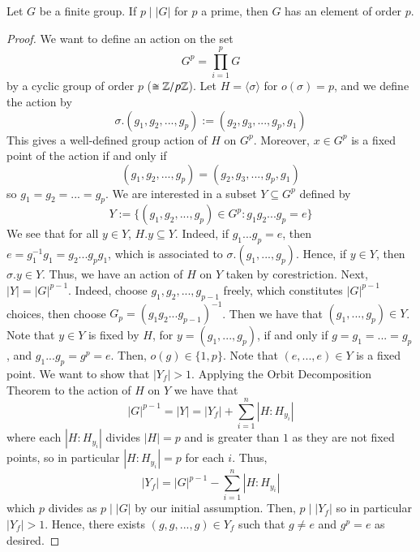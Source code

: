 \documentclass[12pt, a4paper, oneside, openright, titlepage]{book}
\begin{document}
\begin{namthm}\label{thmname:cauchpthm}
        Let $G$ be a finite group. If $p\;\vert\;|G|$ for $p$ a prime, then $G$ has an element of order $p$.
\end{namthm}
\begin{proof}
        We want to define an action on the set $$G^p = \prod\limits_{i=1}^pG$$ by a cyclic group of order $p$ ($\cong \mathbb Z/p\mathbb Z$). Let $H = \langle \sigma \rangle$ for $o(\sigma) = p$, and we define the action by \begin{equation}
                \sigma.(g_1,g_2,...,g_p):=(g_2,g_3,...,g_p,g_1)
        \end{equation}
        This gives a well-defined group action of $H$ on $G^p$. Moreover, $x \in G^p$ is a fixed point of the action if and only if \begin{equation}
                (g_1,g_2,...,g_p) = (g_2,g_3,...,g_p,g_1)
        \end{equation}
        so $g_1=g_2=...=g_p$. We are interested in a subset $Y \subseteq G^p$ defined by \begin{equation}
                Y:= \{(g_1,g_2,...,g_p)\in G^p: g_1g_2...g_p = e\}
        \end{equation}
        We see that for all $y \in Y$, $H.y \subseteq Y$. Indeed, if $g_1...g_p = e$, then $e = g_1^{-1}g_1 = g_2...g_pg_1$, which is associated to $\sigma.(g_1,...,g_p)$. Hence, if $y \in Y$, then $\sigma.y \in Y$. Thus, we have an action of $H$ on $Y$ taken by corestriction. Next, $|Y| = |G|^{p-1}$. Indeed, choose $g_1,g_2,...,g_{p-1}$ freely, which constitutes $|G|^{p-1}$ choices, then choose $G_p = (g_1g_2...g_{p-1})^{-1}$. Then we have that $(g_1,...,g_p) \in Y$. Note that $y \in Y$ is fixed by $H$, for $y = (g_1,...,g_p)$, if and only if $g=g_1=...=g_p$, and $g_1...g_p = g^p = e$. Then, $o(g) \in \{1,p\}$. Note that $(e,...,e) \in Y$ is a fixed point. We want to show that $|Y_f| > 1$. Applying the Orbit Decomposition Theorem to the action of $H$ on $Y$ we have that \begin{equation}
                |G|^{p-1} = |Y| = |Y_f| + \sum_{i=1}^n|H:H_{y_i}|
        \end{equation}
        where each $|H:H_{y_i}|$ divides $|H| = p$ and is greater than $1$ as they are not fixed points, so in particular $|H:H_{y_i}| = p$ for each $i$. Thus, \begin{equation}
                |Y_f| = |G|^{p-1} - \sum_{i=1}^n|H:H_{y_i}|
        \end{equation}
        which $p$ divides as $p\;\vert\;|G|$ by our initial assumption. Then, $p\;\vert\;|Y_f|$ so in particular $|Y_f| > 1$. Hence, there exists $(g,g,...,g) \in Y_f$ such that $g \neq e$ and $g^p = e$ as desired.
\end{proof}
\end{document}
